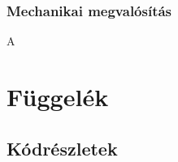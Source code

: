 \documentclass[12pt,a4paper]{article}
\begin{document}
\subsubsection{Mechanikai megvalósítás}
A
\pagebreak

\section*{Függelék}
\subsection*{Kódrészletek}
\end{document}
